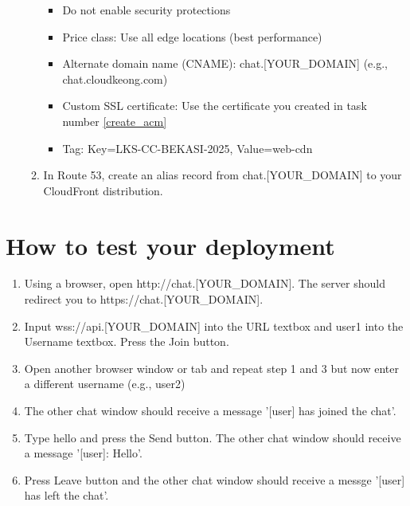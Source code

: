 \documentclass{article}
\begin{document}
\begin{enumerate}
\begin{enumerate}
\begin{itemize}
        \item Do not enable security protections
        \item Price class: Use all edge locations (best performance)
        \item Alternate domain name (CNAME): chat.[YOUR\_DOMAIN] (e.g., chat.cloudkeong.com)
        \item Custom SSL certificate: Use the certificate you created in task number \ref{create_acm}
        \item Tag: Key=LKS-CC-BEKASI-2025, Value=web-cdn
      \end{itemize}
      \item In Route 53, create an alias record from chat.[YOUR\_DOMAIN] to your CloudFront distribution.
    \end{enumerate}
\end{enumerate}
\section{How to test your deployment}
\begin{enumerate}
  \item Using a browser, open http://chat.[YOUR\_DOMAIN]. The server should redirect you to https://chat.[YOUR\_DOMAIN].
  \item Input wss://api.[YOUR\_DOMAIN] into the URL textbox and user1 into the Username textbox. Press the Join button.
  \item Open another browser window or tab and repeat step 1 and 3 but now enter a different username (e.g., user2)
  \item The other chat window should receive a message '[user] has joined the chat'.
  \item Type hello and press the Send button. The other chat window should receive a message '[user]: Hello'.
  \item Press Leave button and the other chat window should receive a messge '[user] has left the chat'.
\end{enumerate}
\end{document}
